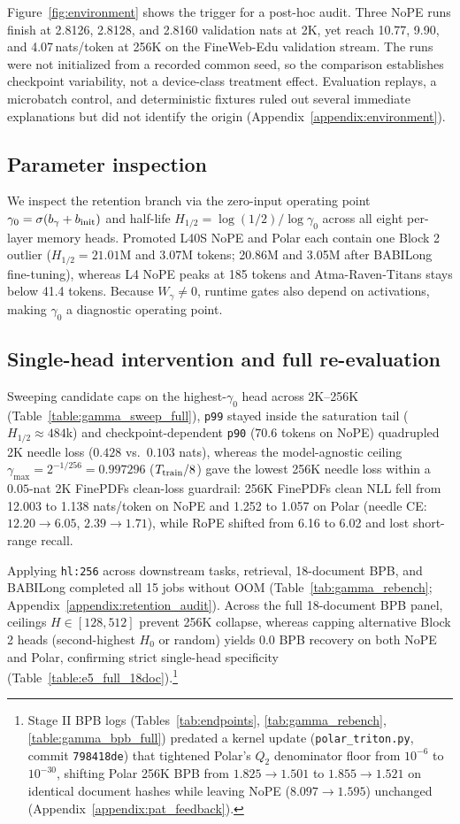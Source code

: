 \documentclass{article}
\newcommand{\rev}[1]{{\color{revcolor}#1}}
\begin{document}
Figure~\ref{fig:environment} shows the trigger for a post-hoc audit. Three NoPE runs finish at 2.8126, 2.8128, and 2.8160 validation nats at 2K, yet reach 10.77, 9.90, and 4.07\rev{\,nats/token at 256K on the FineWeb-Edu validation stream.} The runs were not initialized from a recorded common seed, so the comparison establishes checkpoint variability, not a device-class treatment effect. Evaluation replays, a microbatch control, and deterministic fixtures ruled out several immediate explanations but did not identify the origin (Appendix~\ref{appendix:environment}).

\subsection{Parameter inspection}
We inspect the retention branch via the zero-input operating point $\gamma_0=\sigma(b_\gamma+b_{\rm init})$ and half-life $H_{1/2}=\log(1/2)/\log\gamma_0$ across all eight per-layer memory heads. Promoted L40S NoPE and Polar each contain one Block 2 outlier ($H_{1/2}=21.01$M and $3.07$M tokens; 20.86M and 3.05M after BABILong fine-tuning), whereas L4 NoPE peaks at 185 tokens and Atma-Raven-Titans stays below 41.4 tokens. Because $W_\gamma\neq0$, runtime gates also depend on activations, making $\gamma_0$ a diagnostic operating point.

\subsection{Single-head intervention and full re-evaluation}
Sweeping candidate caps on the highest-$\gamma_0$ head across 2K--256K (Table~\ref{table:gamma_sweep_full}), \texttt{p99} stayed inside the saturation tail ($H_{1/2}\approx 484$k) \rev{and checkpoint-dependent \texttt{p90} ($70.6$ tokens on NoPE) quadrupled 2K needle loss ($0.428$ vs.\ $0.103$ nats), whereas the model-agnostic ceiling $\gamma_{\max}=2^{-1/256}=0.997296$ ($T_{\rm train}/8$) gave the lowest 256K needle loss within a $0.05$-nat 2K FinePDFs clean-loss guardrail: 256K FinePDFs clean NLL} fell from 12.003 to 1.138 nats/token on NoPE and 1.252 to 1.057 on Polar (needle CE: $12.20\rightarrow6.05$, $2.39\rightarrow1.71$), while RoPE shifted from 6.16 to 6.02 and lost short-range recall.

Applying \texttt{hl:256} across downstream tasks, retrieval, 18-document BPB, and BABILong completed all 15 jobs without OOM (Table~\ref{tab:gamma_rebench}; Appendix~\ref{appendix:retention_audit}). \rev{Across the full 18-document BPB panel, ceilings $H\in[128,512]$ prevent 256K collapse, whereas capping alternative Block 2 heads (second-highest $H_0$ or random) yields $0.0$ BPB recovery on both NoPE and Polar, confirming strict single-head specificity (Table~\ref{table:e5_full_18doc}).}\footnote{\rev{Stage II BPB logs (Tables~\ref{tab:endpoints}, \ref{tab:gamma_rebench}, \ref{table:gamma_bpb_full}) predated a kernel update (\texttt{polar\_triton.py}, commit \texttt{798418de}) that tightened Polar's $Q_2$ denominator floor from $10^{-6}$ to $10^{-30}$, shifting Polar 256K BPB from $1.825\rightarrow1.501$ to $1.855\rightarrow1.521$ on identical document hashes while leaving NoPE ($8.097\rightarrow1.595$) unchanged (Appendix~\ref{appendix:pat_feedback}).}}
\end{document}
